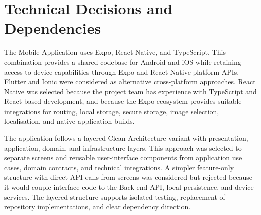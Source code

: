 \section{Technical Decisions and Dependencies}
\label{sec:technical-decisions}

The \tradesq{} Mobile Application uses Expo, React Native, and TypeScript.
This combination provides a shared codebase for Android and iOS while retaining access to device capabilities through Expo and React Native platform APIs.
Flutter and Ionic were considered as alternative cross-platform approaches.
React Native was selected because the project team has experience with TypeScript and React-based development, and because the Expo ecosystem provides suitable integrations for routing, local storage, secure storage, image selection, localisation, and native application builds.

The application follows a layered Clean Architecture variant with presentation, application, domain, and infrastructure layers.
This approach was selected to separate screens and reusable user-interface components from application use cases, domain contracts, and technical integrations.
A simpler feature-only structure with direct API calls from screens was considered but rejected because it would couple interface code to the Back-end API, local persistence, and device services.
The layered structure supports isolated testing, replacement of repository implementations, and clear dependency direction.

